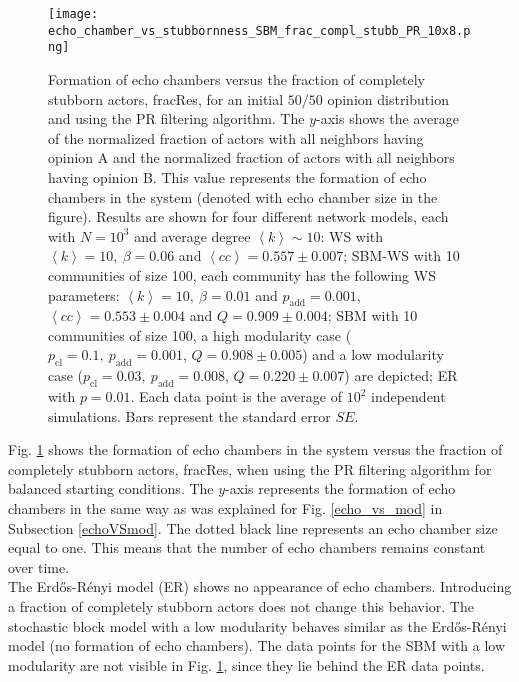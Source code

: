 \documentclass[11 pt , letterpaper , twoside , openright]{book}
\begin{document}
\begin{figure}[H]
	\texttt{[image: echo\_chamber\_vs\_stubbornness\_SBM\_frac\_compl\_stubb\_PR\_10x8.png]}
	\captionsetup{format=plain}
	\caption[Formation of echo chambers versus fraction of completely stubborn actors for the PR filtering algorithm and an initial $50/50$ opinion distribution.]{Formation of echo chambers versus the fraction of completely stubborn actors, fracRes, for an initial $50/50$ opinion distribution and using the PR filtering algorithm. The $y$-axis shows the average of the normalized fraction of actors with all neighbors having opinion A and the normalized fraction of actors with all neighbors having opinion B. This value represents the formation of echo chambers in the system (denoted with echo chamber size in the figure). Results are shown for four different network models, each with $N=10^3$ and average degree $\left<k\right> \sim 10$: WS with $\left<k\right> =10,\ \beta = 0.06$ and $\left<cc\right> = 0.557 \pm 0.007$; SBM-WS with 10 communities of size 100, each community has the following WS parameters: $\left<k\right> = 10,\ \beta = 0.01$ and $p_{\text{add}} = 0.001$, $\left<cc\right> = 0.553 \pm 0.004$ and $Q = 0.909 \pm 0.004$; SBM with 10 communities of size 100, a high modularity case ($p_{\text{cl}} = 0.1,\ p_{\text{add}} = 0.001$, $Q = 0.908 \pm 0.005$) and a low modularity case ($p_{\text{cl}} = 0.03,\ p_{\text{add}} = 0.008$, $Q = 0.220 \pm 0.007$) are depicted; ER with $p= 0.01$. Each data point is the average of $10^2$ independent simulations. Bars represent the standard error $SE$.}
\label{echo_vs_frac_complStubb}
\end{figure}
\noindent
Fig. \ref{echo_vs_frac_complStubb} shows the formation of echo chambers in the system versus the fraction of completely stubborn actors, fracRes, when using the PR filtering algorithm for balanced starting conditions. The $y$-axis represents the formation of echo chambers in the same way as was explained for Fig. \ref{echo_vs_mod} in Subsection \ref{echoVSmod}. The dotted black line represents an echo chamber size equal to one. This means that the number of echo chambers remains constant over time.\\
\newline
The Erd\H{o}s-R\'{e}nyi model (ER) shows no appearance of echo chambers. Introducing a fraction of completely stubborn actors does not change this behavior. The stochastic block model with a low modularity behaves similar as the Erd\H{o}s-R\'{e}nyi model (no formation of echo chambers). The data points for the SBM with a low modularity are not visible in Fig. \ref{echo_vs_frac_complStubb}, since they lie behind the ER data points.\\
\end{document}
